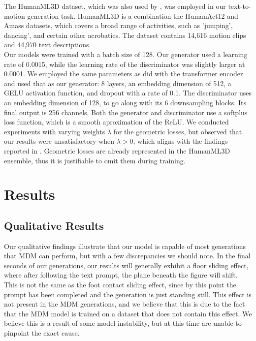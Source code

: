 \documentclass[10pt,twocolumn,letterpaper]{article}
\begin{document}
The HumanML3D dataset, which was also used by \cite{Tevet23}, was employed in our text-to-motion generation task. HumanML3D \cite{Guo_2022_CVPR}
is a combination the HumanAct12 \cite{guo2020action2motion} and Amass \cite{Amass} datasets, which covers a broad range of activities, such as 'jumping', 
dancing', and certain other acrobatics. The dataset contains 14,616 motion clips and 44,970 text descriptions.
\\

Our models were trained with a batch size of 128. Our generator used a learning rate of 0.0015, while the learning rate of the discriminator was slightly 
larger at 0.0001. We employed the same parameters as \cite{Tevet23} did with the transformer encoder and used that as our generator: 8 layers, an embedding 
dimension of 512, a GELU activation function, and dropout with a rate of 0.1. The discriminator uses an embedding dimension of 128, to go along with its 6 
downsampling blocks. Its final output is 256 channels. Both the generator and discriminator use a softplus loss function, which is a smooth aproximation 
of the ReLU. We conducted experiments with varying weights $\lambda$ for the geometric losses, but observed that our results were unsatisfactory when 
$\lambda > 0$, which aligns with the findings reported in \cite{Tevet23}. Geometric losses are already represented in the HumanML3D ensemble, thus it is
justifiable to omit them during training.
\section{Results}
\label{sec:results}
\subsection{Qualitative Results}

Our qualitative findings illustrate that our model is capable of most generations that MDM can perform, but with a few discrepancies we should note. In the 
final seconds of our generations, our results will generally exhibit a floor sliding effect, where after following the text prompt, the plane beneath the
figure will shift. This is not the same as the foot contact sliding effect, since by this point the prompt has been completed and the generation is just 
standing still. This effect is not present in the MDM generations, and we believe that this is due to the fact that the MDM model is trained on a dataset
that does not contain this effect. We believe this is a result of some model instability, but at this time are unable to pinpoint the exact cause.
\\
\end{document}
